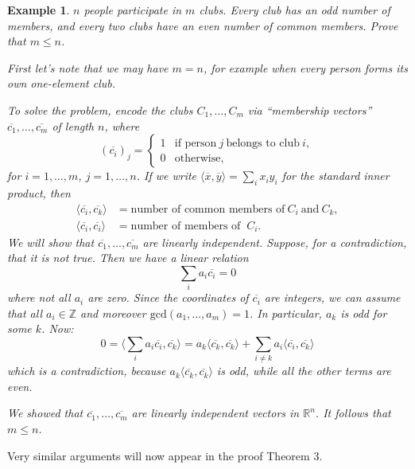 \documentclass[a4paper]{article}
\theoremstyle{plain}
\theoremstyle{myremark}
\newtheorem{example}[lemma]{Example}
\newcommand{\oo}[1]{\overline{#1}}
\newcommand{\RR}{\mathbb{R}}
\newcommand{\ZZ}{\mathbb{Z}}
\begin{document}
\begin{example}
$n$ people participate in $m$ clubs. Every club has an odd number of members, and every two clubs have an even number of common members. Prove that $m\leq n$.

First let's note that we may have $m=n$, for example when every person forms its own one-element club.

To solve the problem, encode the clubs $C_1,\ldots,C_m$ via ``membership vectors'' $\oo{c_1},\ldots,\oo{c_m}$ of length $n$, where
$$(\oo{c_i})_j=
\begin{cases}
1 & \textrm{if person}\ j\ \textrm{belongs to club}\ i,\\
0 & \textrm{otherwise},
\end{cases}
$$
for $i=1,\ldots,m$, $j=1,\ldots,n$. If we write $\langle\oo{x},\oo{y}\rangle=\sum_ix_iy_i$ for the standard inner product, then
\begin{align*}
\langle \oo{c_i},\oo{c_k}\rangle &= \textrm{number of common members of}\ C_i\ \textrm{and}\ C_k,\\
\langle \oo{c_i},\oo{c_i}\rangle &= \textrm{number of members of }\ C_i.
\end{align*}
We will show that $\oo{c_1},\ldots,\oo{c_m}$ are linearly independent. Suppose, for a contradiction, that it is not true. Then we have a linear relation
$$\sum_ia_i\oo{c_i}=0$$
where not all $a_i$ are zero. Since the coordinates of $\oo{c_i}$ are integers, we can assume that all $a_i\in \ZZ$ and moreover $\textrm{gcd}(a_1,\ldots,a_m)=1$. In particular, $a_k$ is odd for some $k$. Now:
$$0=\langle\sum_ia_i\oo{c_i},\oo{c_k}\rangle=a_k\langle \oo{c_k},\oo{c_k}\rangle+\sum_{i\neq k}a_i\langle \oo{c_i},\oo{c_k}\rangle$$
which is a contradiction, because $a_k\langle\oo{c_k},\oo{c_k}\rangle$ is odd, while all the other terms are even.

We showed that $\oo{c_1},\ldots,\oo{c_m}$ are linearly independent vectors in $\RR^n$. It follows that $m\leq n$.
\end{example}

Very similar arguments will now appear in the proof Theorem 3.
\end{document}
